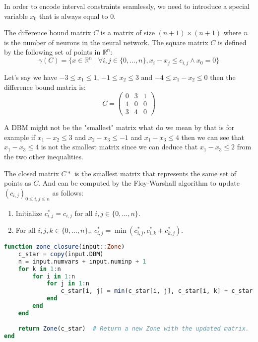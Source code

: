 \documentclass{article}
\begin{document}
In order to encode interval constraints seamlessly, we need to introduce a special variable \(x_0 \) that is always equal to 0.

\begin{definition}
    The difference bound matrix \(C \) is a matrix of size \((n+1) \times (n+1) \) where \(n\) is the number of neurons in the neural network.
    The square matrix \(C \) is defined by the following set of points in \(\mathbb{R^n} \):
    \[ \gamma(C) = \{x \in \mathbb{R}^n \mid \forall i,j \in \{0, \ldots, n\}, x_i - x_j \leq c_{i,j} \land x_0 = 0 \} \]
\end{definition}


\begin{example}
Let's say we have \(-3 \leq  x_1 \leq 1 \), \(-1 \leq x_2 \leq 3 \) and \(-4 \leq x_1 - x_2 \leq 0 \) then the difference bound matrix is:
\[
    C = \begin{pmatrix}
        0 & 3 & 1 \\
        1 & 0 & 0 \\
        3 & 4 & 0
    \end{pmatrix}
\]
\end{example}

A DBM might not be the "smallest" matrix what do we mean by that is for example if \(x_1 - x_2 \leq 3 \) and \(x_2 - x_3 \leq -1 \) and  \(x_1 - x_3 \leq 4 \) then we can see that \(x_1 - x_3 \leq 4 \) is not the smallest matrix since we can deduce that \(x_1 - x_3 \leq 2 \) from the two other inequalities.

\begin{definition}
    The closed matrix \(C* \) is the smallest matrix that represents the same set of points as \(C \). And can be computed by the Floy-Warshall algorithm to update \((c_{i,j})_{0\leq i,j\leq n} \) as follows:
    \begin{enumerate}
        \item Initialize \(c^*_{i,j} = c_{i,j} \) for all \(i,j \in \{0, \ldots, n\} \).
        \item For all \(i,j,k \in \{0, \ldots, n\} \),, \(c^*_{i,j} = \min(c^*_{i,j}, c^*_{i,k} + c^*_{k,j}) \).
    \end{enumerate}
\end{definition}

\begin{lstlisting}[language= Julia]
function zone_closure(input::Zone)
    c_star = copy(input.DBM)
    n = input.numvars + input.numinp + 1
    for k in 1:n
        for i in 1:n
            for j in 1:n
                c_star[i, j] = min(c_star[i, j], c_star[i, k] + c_star[k, j])
            end
        end
    end

    return Zone(c_star)  # Return a new Zone with the updated matrix.
end
\end{lstlisting}
\end{document}
